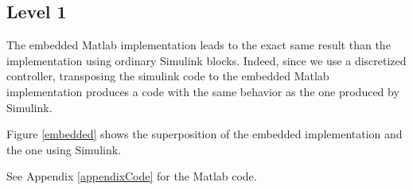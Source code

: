 \subsection*{Level 1}

The embedded Matlab implementation leads to the exact same result than the implementation using ordinary Simulink blocks. Indeed, since we use a discretized controller, transposing the simulink code to the embedded Matlab implementation produces a code with the same behavior as the one produced by Simulink.

Figure \ref{embedded} shows the superposition of the embedded implementation and the one using Simulink.

See Appendix \ref{appendixCode} for the Matlab code.

